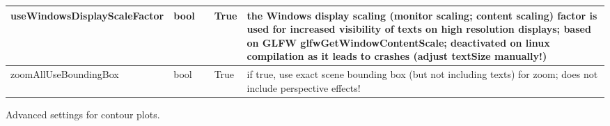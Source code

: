 \begin{center}
\begin{longtable}{| p{4.2cm} | p{2.5cm} | p{0.3cm} | p{3.0cm} | p{6cm} |}
    useWindowsDisplayScaleFactor &     bool &      &     True &     the Windows display scaling (monitor scaling; content scaling) factor is used for increased visibility of texts on high resolution displays; based on GLFW glfwGetWindowContentScale; deactivated on linux compilation as it leads to crashes (adjust textSize manually!)\\ \hline
    zoomAllUseBoundingBox &     bool &      &     True &     if true, use exact scene bounding box (but not including texts) for zoom; does not include perspective effects!\\ \hline
	  \end{longtable}
	\end{center}



\label{sec:VSettingsContourAdvanced}
Advanced settings for contour plots.

